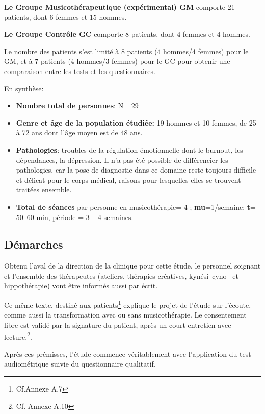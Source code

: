 \textbf{Le Groupe Musicothérapeutique (expérimental) GM} comporte 21
patients, dont 6
femmes et 15 hommes.

\textbf{Le  Groupe Contrôle GC} comporte 8 patients, dont 4 femmes et 4 hommes.

Le nombre
des patients s'est limité  à 8
patients (4 hommes/4 femmes) pour le GM, et à 7 patients (4 hommes/3
femmes) pour le GC pour obtenir une comparaison entre les tests et les questionnaires.




En synthèse:
 \begin{itemize}
 
 \item \textbf{Nombre total de personnes}: N= 29 
\item\textbf{Genre et âge de la population étudiée:}  19 hommes et 10 femmes, de 25 à 72
  ans dont l'âge moyen est de 48 ans.
 \item\textbf{Pathologies}: troubles de la régulation émotionnelle
   dont le burnout, les dépendances, la dépression.
   Il n'a pas été
   possible de différencier les pathologies, car la pose de
   diagnostic dans ce domaine reste toujours difficile et délicat pour le corps médical, raisons pour lesquelles elles
   se trouvent traitées ensemble.
 \item \textbf{Total de séances} par personne en
   musicothérapie= 4 ;   \textbf{mu}=1/semaine;  
 \textbf{t}= 50--60 min, période = 3 -- 4 semaines.
\end{itemize}




\subsection{Démarches}
Obtenu l'aval de la direction de la
clinique pour cette étude,  le personnel soignant et l'ensemble des
thérapeutes (ateliers, thérapies créatives, kynési--cyno--
et hippothérapie) vont être informés aussi par écrit.

Ce même texte, destiné aux
patients\footnote{Cf.Annexe A.7} explique le projet de l'étude sur l'écoute, comme aussi la transformation
avec ou sans musicothérapie.
Le consentement libre est validé par la signature du patient, après
un court entretien avec lecture.\footnote{Cf. Annexe A.10}.


Après ces prémisses, l'étude commence véritablement avec l'application du test
audiométrique suivie du questionnaire qualitatif.

